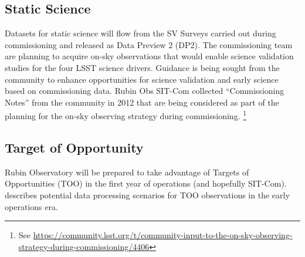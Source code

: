 \subsection{Static Science}

Datasets for static science will flow from the SV Surveys carried out during commissioning and released as Data Preview 2 (DP2).
The commissioning team are planning to acquire on-sky observations that would enable science validation studies for the four LSST science drivers.
Guidance is being sought from the community to enhance opportunities for science validation and early science  based on commissioning data.
Rubin Obs SIT-Com collected ``Commissioning Notes'' from the community in 2012 that are being considered as part of the
planning for the on-sky observing strategy during commissioning. \footnote {See \url{https://community.lsst.org/t/community-input-to-the-on-sky-observing-strategy-during-commissioning/4406}}


\subsection{Target of Opportunity}

Rubin Observatory will be prepared to take advantage of Targets of Opportunities (TOO) in the first year of operations (and hopefully SIT-Com).
 describes potential data processing scenarios for TOO observations in the early operations era.
